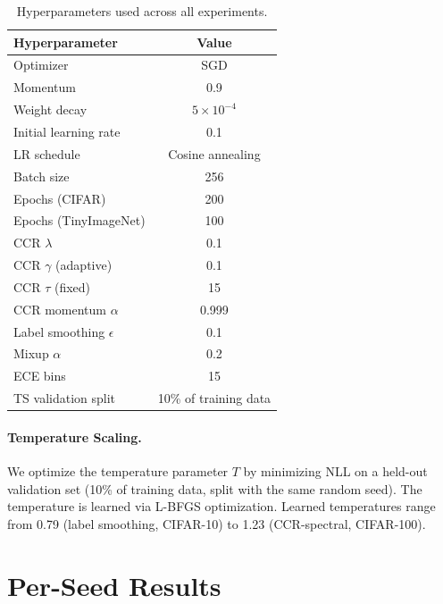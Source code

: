 \documentclass{article}
\begin{document}
\begin{table}[h]
\caption{Hyperparameters used across all experiments.}
\label{tab:hyperparams}
\centering
\small
\begin{tabular}{lc}
\toprule
Hyperparameter & Value \\
\midrule
Optimizer & SGD \\
Momentum & 0.9 \\
Weight decay & $5 \times 10^{-4}$ \\
Initial learning rate & 0.1 \\
LR schedule & Cosine annealing \\
Batch size & 256 \\
Epochs (CIFAR) & 200 \\
Epochs (TinyImageNet) & 100 \\
\midrule
CCR $\lambda$ & 0.1 \\
CCR $\gamma$ (adaptive) & 0.1 \\
CCR $\tau$ (fixed) & 15 \\
CCR momentum $\alpha$ & 0.999 \\
\midrule
Label smoothing $\epsilon$ & 0.1 \\
Mixup $\alpha$ & 0.2 \\
ECE bins & 15 \\
TS validation split & 10\% of training data \\
\bottomrule
\end{tabular}
\end{table}

\paragraph{Temperature Scaling.}
We optimize the temperature parameter $T$ by minimizing NLL on a held-out validation set (10\% of training data, split with the same random seed). The temperature is learned via L-BFGS optimization. Learned temperatures range from 0.79 (label smoothing, CIFAR-10) to 1.23 (CCR-spectral, CIFAR-100).

\section{Per-Seed Results}
\label{app:per_seed}
\end{document}
